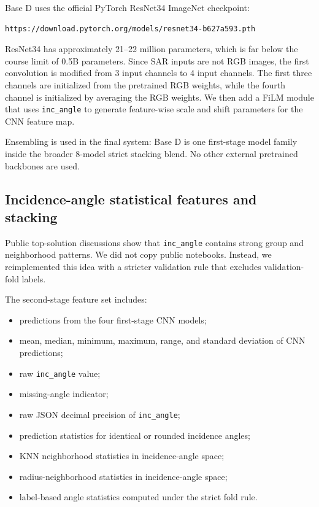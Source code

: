 \documentclass[11pt]{article}
\begin{document}
Base D uses the official PyTorch ResNet34 ImageNet checkpoint:

\begin{lstlisting}
https://download.pytorch.org/models/resnet34-b627a593.pth
\end{lstlisting}

ResNet34 has approximately 21--22 million parameters, which is far below the course limit of 0.5B parameters. Since SAR inputs are not RGB images, the first convolution is modified from 3 input channels to 4 input channels. The first three channels are initialized from the pretrained RGB weights, while the fourth channel is initialized by averaging the RGB weights. We then add a FiLM module that uses \texttt{inc\_angle} to generate feature-wise scale and shift parameters for the CNN feature map.

Ensembling is used in the final system: Base D is one first-stage model family inside the broader 8-model strict stacking blend. No other external pretrained backbones are used.

\subsection{Incidence-angle statistical features and stacking}

Public top-solution discussions show that \texttt{inc\_angle} contains strong group and neighborhood patterns. We did not copy public notebooks. Instead, we reimplemented this idea with a stricter validation rule that excludes validation-fold labels.

The second-stage feature set includes:

\begin{itemize}
  \item predictions from the four first-stage CNN models;
  \item mean, median, minimum, maximum, range, and standard deviation of CNN predictions;
  \item raw \texttt{inc\_angle} value;
  \item missing-angle indicator;
  \item raw JSON decimal precision of \texttt{inc\_angle};
  \item prediction statistics for identical or rounded incidence angles;
  \item KNN neighborhood statistics in incidence-angle space;
  \item radius-neighborhood statistics in incidence-angle space;
  \item label-based angle statistics computed under the strict fold rule.
\end{itemize}
\end{document}
